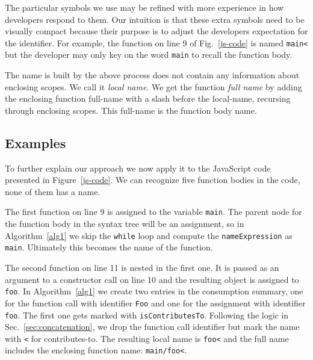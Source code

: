 \documentclass[10pt, preprint]{sigplanconf}
\begin{document}
The particular symbols we use may be refined with more experience in how developers respond to them. Our intuition is that these extra symbols need to be visually compact because their purpose is to adjust the developers expectation for the identifier. For example, the function on line 9 of Fig.~\ref{js-code} is named \texttt{main<} but the developer may only key on the word \texttt{main} to recall the function body. 

The name is built by the above process does not contain any information about enclosing scopes. We call it \textit{local name}. We get the function \textit{full name} by adding the enclosing function full-name with a slash before the local-name, recursing through enclosing scopes. This full-name is the function body name.



\subsection{Examples}
\label{sec:examples}

To further explain our approach we now apply it to the JavaScript code presented in Figure~\ref{js-code}. We can recognize five function bodies in the code, none of them has a name. 

The first function on line 9 is assigned to the variable \verb|main|. The parent node for the function body in the syntax tree will be an assignment, so in Algorithm~\ref{alg1} we skip the \verb|while| loop and compute the \verb|nameExpression| as \verb|main|.  Ultimately this becomes the name of the function.

The second function on line 11 is nested in the first one.  It is passed as an argument to a constructor call on line 10 and the resulting object is assigned to \verb|foo|. In Algorithm~\ref{alg1} we create two entries in the consumption summary, one for the function call with identifier \verb|Foo| and one for the assignment with identifier \verb|foo|. The first one gets marked with \verb|isContributesTo|.  Following the logic in Sec.~\ref{sec:concatenation}, we drop the function call identifier but mark the name with \verb|<| for contributes-to. The resulting local name is \verb|foo<| and the full name includes the enclosing function name: \verb|main/foo<|.
\end{document}
